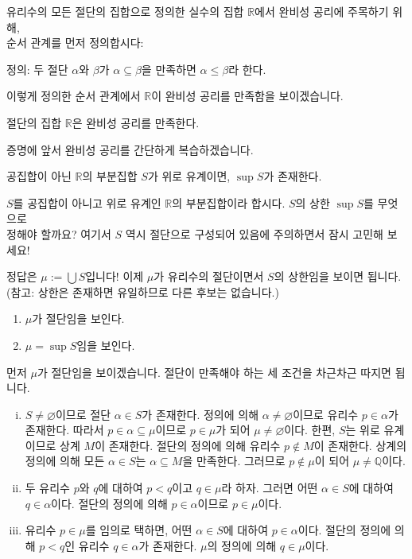 \documentclass[serif]{beamer}
\begin{document}
\begin{frame}{}
    유리수의 모든 절단의 집합으로 정의한 실수의 집합 $\mathbb R$에서 완비성 공리에 주목하기 위해, \\
    순서 관계를 먼저 정의합시다:
    \begin{center}
        정의: 두 절단 $\alpha$와 $\beta$가 $\alpha\subseteq\beta$을 만족하면 $\alpha\leq\beta$라 한다.
    \end{center}
    이렇게 정의한 순서 관계에서 $\mathbb R$이 완비성 공리를 만족함을 보이겠습니다.
    \begin{thm*}{}
        절단의 집합 $\mathbb R$은 완비성 공리를 만족한다.
    \end{thm*}
    증명에 앞서 완비성 공리를 간단하게 복습하겠습니다.
    \begin{hint}[완비성 공리]
        공집합이 아닌 $\mathbb R$의 부분집합 $S$가 위로 유계이면, $\sup S$가 존재한다.
    \end{hint}
    $S$를 공집합이 아니고 위로 유계인 $\mathbb R$의 부분집합이라 합시다.
    $S$의 상한 $\sup S$를 무엇으로 \\ 정해야 할까요?
    여기서 $S$ 역시 절단으로 구성되어 있음에 주의하면서 잠시 고민해 보세요!
\end{frame}

\begin{frame}{}
    정답은 $\mu:=\bigcup S$입니다! 이제 $\mu$가 유리수의 절단이면서 $S$의 상한임을 보이면 됩니다. \\
    (참고: 상한은 존재하면 유일하므로 다른 후보는 없습니다.)
    \begin{hint}[목표]
        \begin{enumerate}[(1)]
            \item $\mu$가 절단임을 보인다.
            \item $\mu=\sup S$임을 보인다.
        \end{enumerate}
    \end{hint}
    먼저 $\mu$가 절단임을 보이겠습니다. 절단이 만족해야 하는 세 조건을 차근차근 따지면 됩니다.
    \begin{enumerate}[(i)]
        \item $S\ne\varnothing$이므로 절단 $\alpha\in S$가 존재한다.
            정의에 의해 $\alpha\ne\varnothing$이므로 유리수 $p\in\alpha$가 존재한다.
            따라서 $p\in\alpha\subseteq\mu$이므로 $p\in\mu$가 되어 $\mu\ne\varnothing$이다.
            한편, $S$는 위로 유계이므로 상계 $M$이 존재한다.
            절단의 정의에 의해 유리수 $p\notin M$이 존재한다.
            상계의 정의에 의해 모든 $\alpha\in S$는 $\alpha\subseteq M$을 만족한다.
            그러므로 $p\notin\mu$이 되어 $\mu\ne\mathbb Q$이다.
        \item 두 유리수 $p$와 $q$에 대하여 $p<q$이고 $q\in\mu$라 하자.
            그러면 어떤 $\alpha\in S$에 대하여 $q\in\alpha$이다.
            절단의 정의에 의해 $p\in\alpha$이므로 $p\in\mu$이다.
        \item 유리수 $p\in\mu$를 임의로 택하면, 어떤 $\alpha\in S$에 대하여 $p\in\alpha$이다.
            절단의 정의에 의해 $p<q$인 유리수 $q\in\alpha$가 존재한다.
            $\mu$의 정의에 의해 $q\in\mu$이다.
    \end{enumerate}
\end{frame}
\end{document}
